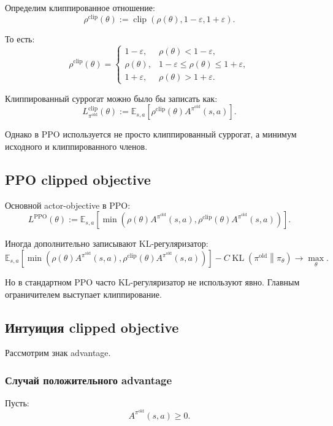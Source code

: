 \documentclass[12pt,a4paper]{article}
\begin{document}
Определим клиппированное отношение:
\[
\rho^{\mathrm{clip}}(\theta)
:=
\operatorname{clip}
\left(
\rho(\theta),
1-\varepsilon,
1+\varepsilon
\right).
\]

То есть:
\[
\rho^{\mathrm{clip}}(\theta)
=
\begin{cases}
1-\varepsilon, & \rho(\theta)<1-\varepsilon,\\
\rho(\theta), & 1-\varepsilon\le \rho(\theta)\le 1+\varepsilon,\\
1+\varepsilon, & \rho(\theta)>1+\varepsilon.
\end{cases}
\]

Клиппированный суррогат можно было бы записать как:
\[
L_{\pi^{\mathrm{old}}}^{\mathrm{clip}}(\theta)
:=
\mathbb E_{s,a}
\left[
\rho^{\mathrm{clip}}(\theta)
A^{\pi^{\mathrm{old}}}(s,a)
\right].
\]

Однако в PPO используется не просто клиппированный суррогат, а минимум исходного и клиппированного членов.

\subsection{PPO clipped objective}

Основной actor-objective в PPO:
\[
L^{\mathrm{PPO}}(\theta)
:=
\mathbb E_{s,a}
\left[
\min
\left(
\rho(\theta)
A^{\pi^{\mathrm{old}}}(s,a),
\rho^{\mathrm{clip}}(\theta)
A^{\pi^{\mathrm{old}}}(s,a)
\right)
\right].
\]

Иногда дополнительно записывают KL-регуляризатор:
\[
\mathbb E_{s,a}
\left[
\min
\left(
\rho(\theta)
A^{\pi^{\mathrm{old}}}(s,a),
\rho^{\mathrm{clip}}(\theta)
A^{\pi^{\mathrm{old}}}(s,a)
\right)
\right]
-
C
\operatorname{KL}
\left(
\pi^{\mathrm{old}}
\middle\|
\pi_\theta
\right)
\to
\max_\theta.
\]

Но в стандартном PPO часто KL-регуляризатор не используют явно. Главным ограничителем выступает клиппирование.

\subsection{Интуиция clipped objective}

Рассмотрим знак advantage.

\subsubsection{Случай положительного advantage}

Пусть:
\[
A^{\pi^{\mathrm{old}}}(s,a)\ge 0.
\]
\end{document}
